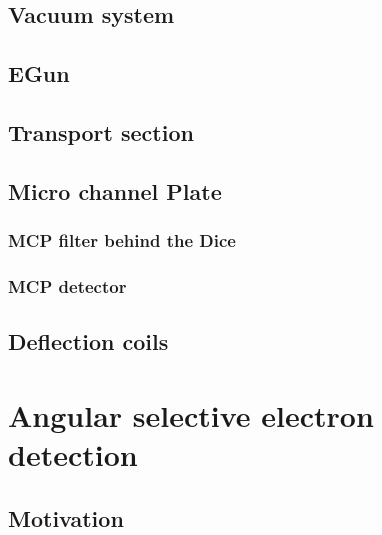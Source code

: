 \documentclass[11pt]{article} %
\begin{document}
	\subsection{Vacuum system}
	\subsection{EGun}
	\subsection{Transport section}
	\subsection{Micro channel Plate}
		\subsubsection{MCP filter behind the Dice}
		\subsubsection{MCP detector} 
	\subsection{Deflection coils}


\newpage

\section{Angular selective electron detection}

	\subsection{Motivation}
			
\end{document}
